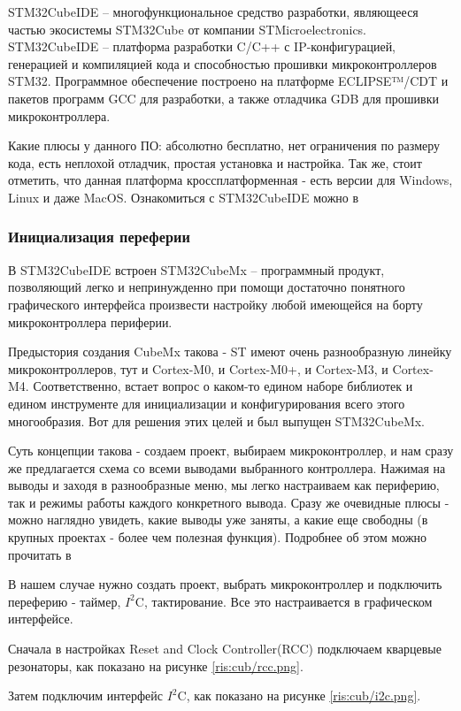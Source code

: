 \begin{sloppypar}
STM32CubeIDE – многофункциональное средство разработки, являющееся частью экосистемы STM32Cube от компании STMicroelectronics.
STM32CubeIDE – платформа разработки C/C++ с IP-конфигурацией, генерацией и компиляцией кода и способностью прошивки микроконтроллеров STM32.
Программное обеспечение построено на платформе ECLIPSE™/CDT и пакетов программ GCC для разработки, а также отладчика GDB для прошивки микроконтроллера.


Какие плюсы у данного ПО: абсолютно бесплатно, нет ограничения по размеру кода, есть неплохой отладчик, простая установка и настройка. Так же, стоит отметить, что данная платформа кроссплатформенная - есть версии для Windows, Linux и даже MacOS. Ознакомиться с STM32CubeIDE можно в \cite{STM32CubeIDE}

\subsubsection{Инициализация переферии}
В STM32CubeIDE встроен STM32CubeMx -- программный продукт, позволяющий легко и непринужденно при помощи достаточно понятного графического интерфейса произвести настройку любой имеющейся на борту микроконтроллера периферии. 

Предыстория создания CubeMx такова - ST имеют очень разнообразную линейку микроконтроллеров, тут и Cortex-M0, и Cortex-M0+, и Cortex-M3, и Cortex-M4. Соответственно, встает вопрос о каком-то едином наборе библиотек и едином инструменте для инициализации и конфигурирования всего этого многообразия. Вот для решения этих целей и был выпущен STM32CubeMx.

Суть концепции такова - создаем проект, выбираем микроконтроллер, и нам сразу же предлагается схема со всеми выводами выбранного контроллера. Нажимая на выводы и заходя в разнообразные меню, мы легко настраиваем как периферию, так и режимы работы каждого конкретного вывода. Сразу же очевидные плюсы - можно наглядно увидеть, какие выводы уже заняты, а какие еще свободны (в крупных проектах - более чем полезная функция).
Подробнее об этом можно прочитать в \cite{cube}

В нашем случае нужно создать проект, выбрать микроконтроллер и подключить переферию - таймер, $I^2$C, тактирование. Все это настраивается в графическом интерфейсе.

 Сначала в настройках Reset and Clock Controller(RCC) подключаем кварцевые резонаторы, как показано на рисунке \ref{ris:cub/rcc.png}.

Затем подключим интерфейс $I^2$C, как показано на рисунке \ref{ris:cub/i2c.png}.


\end{sloppypar}
